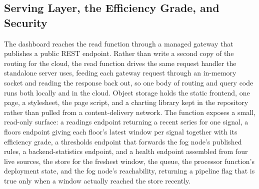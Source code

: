 \documentclass[conference]{IEEEtran}
\begin{document}
\subsection{Serving Layer, the Efficiency Grade, and Security}

The dashboard reaches the read function through a managed gateway that publishes a public REST endpoint. Rather than write a second copy of the routing for the cloud, the read function drives the same request handler the standalone server uses, feeding each gateway request through an in-memory socket and reading the response back out, so one body of routing and query code runs both locally and in the cloud. Object storage holds the static frontend, one page, a stylesheet, the page script, and a charting library kept in the repository rather than pulled from a content-delivery network. The function exposes a small, read-only surface: a readings endpoint returning a recent series for one signal, a floors endpoint giving each floor's latest window per signal together with its efficiency grade, a thresholds endpoint that forwards the fog node's published rules, a backend-statistics endpoint, and a health endpoint assembled from four live sources, the store for the freshest window, the queue, the processor function's deployment state, and the fog node's reachability, returning a pipeline flag that is true only when a window actually reached the store recently.
\end{document}

